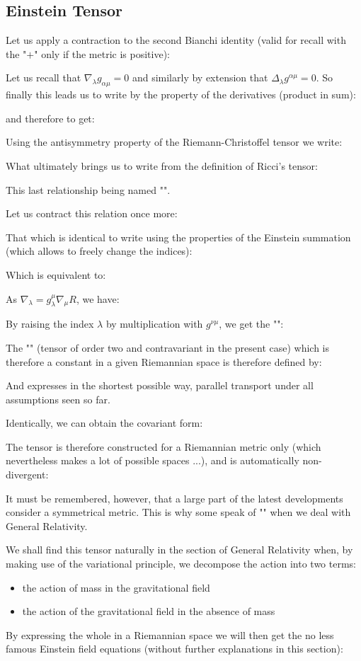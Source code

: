 	\subsection{Einstein Tensor}\label{einstein tensor}
	Let us apply a contraction to the second Bianchi  identity (valid for recall with the "$+$" only if the metric is positive):
	
	Let us recall that $\nabla_\lambda g_{\alpha\mu}=0$ and similarly by extension that $\Delta_\lambda g^{\alpha\mu}=0$. So finally this leads us to write by the property of the derivatives (product in sum):
	
	and therefore to get:
	
	 Using the antisymmetry property of the Riemann-Christoffel tensor we write:
	
	What ultimately brings us to write from the definition of Ricci's tensor:
	
	This last relationship being named "".

	Let us contract this relation once more:
	 
	That which is identical to write using the properties of the Einstein summation (which allows to freely change the indices):
	
	Which is equivalent to:
	
	As $\nabla_\lambda=g_{\lambda}^\mu \nabla_\mu R$, we have:
	
	By raising the index $\lambda$ by multiplication with $g^{\nu\mu}$, we get the "":
	
	The "" (tensor of order two and contravariant in the present case) which is therefore a constant in a given Riemannian space is therefore defined by:
	
	And expresses in the shortest possible way, parallel transport under all assumptions seen so far.

	Identically, we can obtain the covariant form:
	
	The tensor is therefore constructed for a Riemannian metric only (which nevertheless makes a lot of possible spaces ...), and is automatically non-divergent:
	
	It must be remembered, however, that a large part of the latest developments consider a symmetrical metric. This is why some speak of "" when we deal with General Relativity.

	We shall find this tensor naturally in the section of General Relativity when, by making use of the variational principle, we decompose the action into two terms:
	\begin{itemize}
		\item the action of mass in the gravitational field

		\item the action of the gravitational field in the absence of mass
	\end{itemize}
	By expressing the whole in a Riemannian space we will then get the no less famous Einstein field equations (without further explanations in this section):
	
